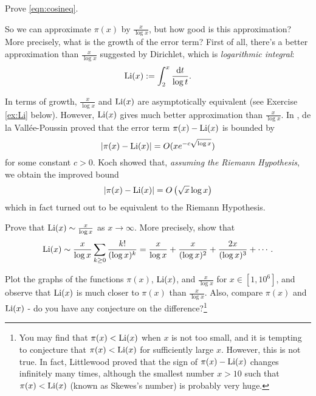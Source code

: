 \begin{exercise}
    Prove \eqref{eqn:cosineq}.
\end{exercise}

So we can approximate $\pi(x)$ by $\frac{x}{\log x}$, but how good is this approximation?
More precisely, what is the growth of the error term?
First of all, there's a better approximation than $\frac{x}{\log x}$ suggested by Dirichlet, which is \emph{logarithmic integral}:
\begin{equation}
    \mathrm{Li}(x) := \int_2^x \frac{\mathrm{d} t}{\log t}.
\end{equation}

In terms of growth, $\frac{x}{\log x}$ and $\mathrm{Li}(x)$ are asymptotically equivalent (see Exercise \ref{ex:Li} below).
However, $\mathrm{Li}(x)$ gives much better approximation than $\frac{x}{\log x}$.
In \cite{de1899fonction}, de la Vall\'ee-Poussin proved that the error term $\pi(x) - \mathrm{Li}(x)$ is bounded by 
\[
|\pi(x) - \mathrm{Li}(x)| = O(x e^{-c \sqrt{\log x}}) 
\]
for some constant $c > 0$.
Koch \cite{von1901distribution} showed that, \emph{assuming the Riemann Hypothesis}, we obtain the improved bound
\begin{equation}
    |\pi(x) - \mathrm{Li}(x)| = O\left(\sqrt{x} \log x\right)
    \label{eqn:koch}
\end{equation}
which in fact turned out to be equivalent to the Riemann Hypothesis.

\begin{exercise}
    \label{ex:Li}
    Prove that $\mathrm{Li}(x) \sim \frac{x}{\log x}$ as $x \to \infty$.
    More precisely, show that
    \begin{equation}
        \mathrm{Li}(x) \sim \frac{x}{\log x} \sum_{k \ge 0} \frac{k!}{(\log x)^k} = \frac{x}{\log x} + \frac{x}{(\log x)^2} + \frac{2x}{(\log x)^3} + \cdots.
    \end{equation}
\end{exercise}

\begin{exercise}\sage
    Plot the graphs of the functions $\pi(x)$, $\mathrm{Li}(x)$, and $\frac{x}{\log x}$ for $x \in [1, 10^6]$, and observe that $\mathrm{Li}(x)$ is much closer to $\pi(x)$ than $\frac{x}{\log x}$.
    Also, compare $\pi(x)$ and $\mathrm{Li}(x)$ - do you have any conjecture on the difference?\footnote{You may find that $\pi(x) < \mathrm{Li}(x)$ when $x$ is not too small, and it is tempting to conjecture that $\pi(x) < \mathrm{Li}(x)$ for sufficiently large $x$. However, this is not true. In fact, Littlewood \cite{littlewood1914distribution} proved that the sign of $\pi(x) - \mathrm{Li}(x)$ changes infinitely many times, although the smallest number $x > 10$ such that $\pi(x) < \mathrm{Li}(x)$ (known as Skewes's number) is probably very huge.}
\end{exercise}



